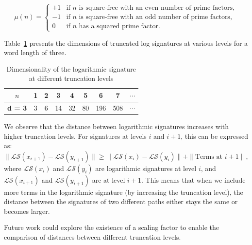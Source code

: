 \begin{equation}
    \mu(n) = 
    \begin{cases} 
        +1 & \text{if } n \text{ is square-free with an even number of prime factors}, \\
        -1 & \text{if } n \text{ is square-free with an odd number of prime factors}, \\
        0 & \text{if } n \text{ has a squared prime factor}.
    \end{cases}
\end{equation}

Table~\ref{tab:dimensionality} presents the dimensions of truncated log signatures at various levels for a word length of three.

\begin{table}
    \centering
    \begin{tabular}{|c|c|c|c|c|c|c|c|c|}
    \hline
    \textbf{\( n \)} & \textbf{1} & \textbf{2} & \textbf{3} & \textbf{4} & \textbf{5} & \textbf{6} & \textbf{7} & \(\cdots\)\\
    \hline
    \textbf{d = 3} & 3 & 6 & 14 & 32 & 80 & 196 & 508 & \(\cdots\)\\
    \hline
    \end{tabular}
    \caption{Dimensionality of the logarithmic signature at different truncation levels}
    \label{tab:dimensionality}
\end{table}

We observe that the distance between logarithmic signatures increases with higher truncation levels. For signatures at levels \( i \) and \( i+1 \), this can be expressed as:
\begin{equation}
\|\mathcal{LS}(x_{i+1}) - \mathcal{LS}(y_{i+1})\| \geq \|\mathcal{LS}(x_i) - \mathcal{LS}(y_i)\| + \| \text{Terms at } i+1 \|,
\label{eq:distance_truncation}
\end{equation}
where \( \mathcal{LS}(x_i) \) and \( \mathcal{LS}(y_i) \) are logarithmic signatures at level \( i \), and \( \mathcal{LS}(x_{i+1}) \) and \( \mathcal{LS}(y_{i+1}) \) are at level \( i+1 \). This means that when we include more terms in the logarithmic signature (by increasing the truncation level), the distance between the signatures of two different paths either stays the same or becomes larger.

Future work could explore the existence of a scaling factor to enable the comparison of distances between different truncation levels.


